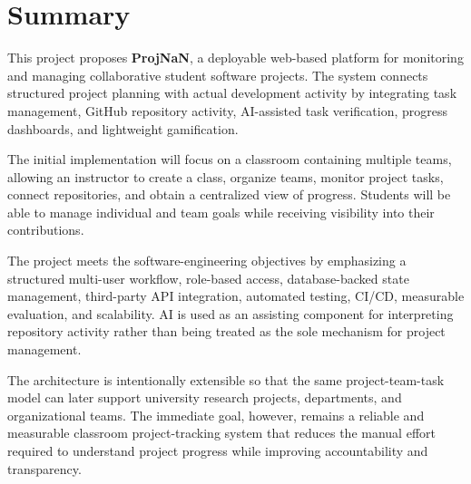 \documentclass[11pt,a4paper]{article}
\begin{document}
\section{Summary}

This project proposes \textbf{ProjNaN}, a deployable web-based platform for monitoring and managing collaborative student software projects. The system connects structured project planning with actual development activity by integrating task management, GitHub repository activity, AI-assisted task verification, progress dashboards, and lightweight gamification.

The initial implementation will focus on a classroom containing multiple teams, allowing an instructor to create a class, organize teams, monitor project tasks, connect repositories, and obtain a centralized view of progress. Students will be able to manage individual and team goals while receiving visibility into their contributions.

The project meets the software-engineering objectives by emphasizing a structured multi-user workflow, role-based access, database-backed state management, third-party API integration, automated testing, CI/CD, measurable evaluation, and scalability. AI is used as an assisting component for interpreting repository activity rather than being treated as the sole mechanism for project management.

The architecture is intentionally extensible so that the same project-team-task model can later support university research projects, departments, and organizational teams. The immediate goal, however, remains a reliable and measurable classroom project-tracking system that reduces the manual effort required to understand project progress while improving accountability and transparency.
\end{document}
